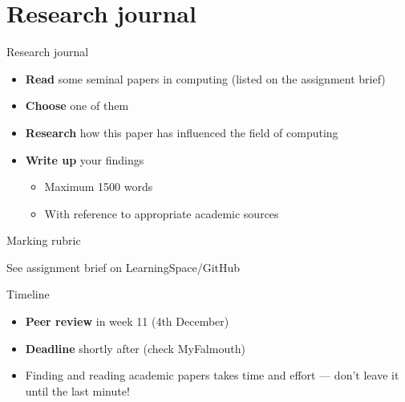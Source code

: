 \part{Research journal}
\frame{\partpage}

\begin{frame}{Research journal}
    \begin{itemize}
        \pause\item \textbf{Read} some seminal papers in computing (listed on the assignment brief)
        \pause\item \textbf{Choose} one of them
        \pause\item \textbf{Research} how this paper has influenced the field of computing
        \pause\item \textbf{Write up} your findings
        \begin{itemize}
            \pause\item Maximum 1500 words
            \pause\item With reference to appropriate academic sources
        \end{itemize}
    \end{itemize}
\end{frame}

\begin{frame}{Marking rubric}
    \begin{center}
        See assignment brief on LearningSpace/GitHub
    \end{center}
\end{frame}

\begin{frame}{Timeline}
    \begin{itemize}
        \pause\item \textbf{Peer review} in week 11 (4th December)
        \pause\item \textbf{Deadline} shortly after (check MyFalmouth)
        \pause\item Finding and reading academic papers takes time and effort --- don't leave it until the last minute!
    \end{itemize}
\end{frame}


